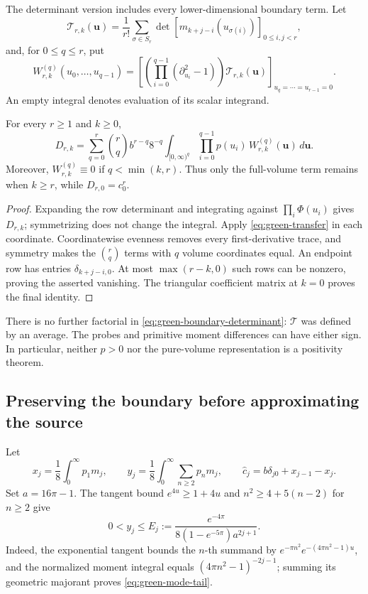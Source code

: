 The determinant version includes every lower-dimensional boundary term.
Let
\begin{equation}
 \mathcal T_{r,k}(\boldsymbol u)
 =\frac1{r!}\sum_{\sigma\in S_r}
   \det[m_{k+j-i}(u_{\sigma(i)})]_{0\le i,j<r},
\end{equation}
and, for \(0\le q\le r\), put
\begin{equation}
 W_{r,k}^{(q)}(u_0,\ldots,u_{q-1})
 =\left[\left(\prod_{i=0}^{q-1}(\partial_{u_i}^2-1)\right)
       \mathcal T_{r,k}(\boldsymbol u)\right]_{u_q=\cdots=u_{r-1}=0}.
\end{equation}
An empty integral denotes evaluation of its scalar integrand.
\begin{proposition}
For every \(r\ge1\) and \(k\ge0\),
\begin{equation}
 D_{r,k}=\sum_{q=0}^r\binom rq b^{r-q}8^{-q}
 \int_{[0,\infty)^q}\prod_{i=0}^{q-1}p(u_i)\,
                    W_{r,k}^{(q)}(\boldsymbol u)\,d\boldsymbol u.
 \label{eq:green-boundary-determinant}
\end{equation}
Moreover, \(W_{r,k}^{(q)}\equiv0\) if \(q<\min(k,r)\).
Thus only the full-volume term remains when \(k\ge r\), while
\(D_{r,0}=c_0^r\).
\end{proposition}
\begin{proof}
Expanding the row determinant and integrating against
\(\prod_i\Phi(u_i)\) gives \(D_{r,k}\); symmetrizing does not change the
integral.  Apply \eqref{eq:green-transfer} in each coordinate.
Coordinatewise evenness removes every first-derivative trace, and symmetry
makes the \(\binom rq\) terms with \(q\) volume coordinates equal.
An endpoint row has entries \(\delta_{k+j-i,0}\).  At most
\(\max(r-k,0)\) such rows can be nonzero, proving the asserted vanishing.
The triangular coefficient matrix at \(k=0\) proves the final identity.
\end{proof}
There is no further factorial in \eqref{eq:green-boundary-determinant}:
\(\mathcal T\) was defined by an average.  The probes and primitive
moment differences can have either sign.  In particular, neither
\(p>0\) nor the pure-volume representation is a positivity theorem.

\subsection{Preserving the boundary before approximating the source}
Let
\begin{equation}
 x_j=\frac18\int_0^\infty p_1m_j,\qquad
 y_j=\frac18\int_0^\infty\sum_{n\ge2}p_nm_j,\qquad
 \widehat c_j=b\delta_{j0}+x_{j-1}-x_j.
\end{equation}
Set \(a=16\pi-1\).  The tangent bound \(e^{4u}\ge1+4u\) and
\(n^2\ge4+5(n-2)\) for \(n\ge2\) give
\begin{equation}
 0<y_j\le E_j:=
 \frac{e^{-4\pi}}{8(1-e^{-5\pi})a^{2j+1}}.
 \label{eq:green-mode-tail}
\end{equation}
Indeed, the exponential tangent bounds the \(n\)-th summand by
\(e^{-\pi n^2}e^{-(4\pi n^2-1)u}\), and the normalized moment
integral equals \((4\pi n^2-1)^{-2j-1}\); summing its geometric
majorant proves \eqref{eq:green-mode-tail}.

